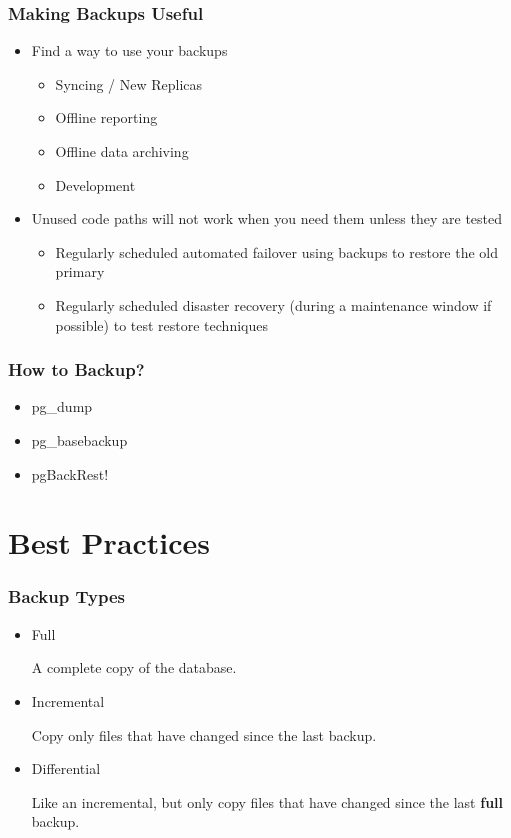 \begin{frame}
    \frametitle{Making Backups Useful}

    \begin{itemize}
        \item Find a way to use your backups

        \begin{itemize}
            \item Syncing / New Replicas
            \item Offline reporting
            \item Offline data archiving
            \item Development
        \end{itemize}

        \item Unused code paths will not work when you need them unless they are tested

        \begin{itemize}
            \item Regularly scheduled automated failover using backups to restore the old primary
            \item Regularly scheduled disaster recovery (during a maintenance window if possible) to test restore techniques
        \end{itemize}
    \end{itemize}
\end{frame}

\begin{frame}
    \frametitle{How to Backup?}

    \begin{itemize}
        \item pg\_dump

        \item pg\_basebackup

        \item pgBackRest!
    \end{itemize}
\end{frame}

\section{Best Practices}

\begin{frame}
    \frametitle{Backup Types}

    \begin{itemize}
        \item Full

        A complete copy of the database.

        \item Incremental

        Copy only files that have changed since the last backup.

        \item Differential

        Like an incremental, but only copy files that have changed since the last \textbf{full} backup.
    \end{itemize}
\end{frame}


